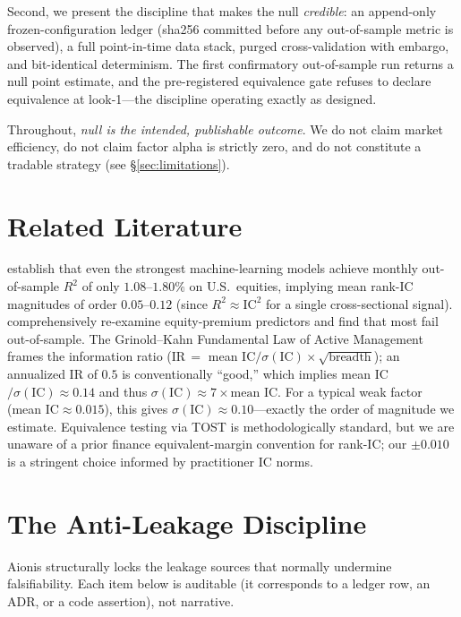 \documentclass[11pt,a4paper]{article}
\begin{document}
Second, we present the discipline that makes the null \emph{credible}: an
append-only frozen-configuration ledger (sha256 committed before any out-of-sample
metric is observed), a full point-in-time data stack, purged cross-validation with
embargo, and bit-identical determinism. The first confirmatory out-of-sample run
returns a null point estimate, and the pre-registered equivalence gate refuses to
declare equivalence at look-1---the discipline operating exactly as designed.

Throughout, \emph{null is the intended, publishable outcome}. We do not claim market
efficiency, do not claim factor alpha is strictly zero, and do not constitute a
tradable strategy (see \S\ref{sec:limitations}).

\section{Related Literature}\label{sec:related}

\citealt{gu2020empirical} establish that even the strongest machine-learning models
achieve monthly out-of-sample $R^2$ of only $1.08$--$1.80\%$ on U.S.\ equities,
implying mean rank-IC magnitudes of order $0.05$--$0.12$ (since $R^2\!\approx\!\text{IC}^2$
for a single cross-sectional signal). \citealt{goyal2008comprehensive} comprehensively
re-examine equity-premium predictors and find that most fail out-of-sample. The
Grinold--Kahn Fundamental Law of Active Management \citep{grinold1999active} frames
the information ratio (IR$\,=$ mean IC$/\sigma(\text{IC})\times\sqrt{\text{breadth}}$);
an annualized IR of $0.5$ is conventionally ``good,'' which implies mean IC$/\sigma(\text{IC})\!\approx\!0.14$
and thus $\sigma(\text{IC})\!\approx\!7\!\times\!\text{mean IC}$. For a typical weak
factor (mean IC$\approx 0.015$), this gives $\sigma(\text{IC})\!\approx\!0.10$---exactly
the order of magnitude we estimate. Equivalence testing via TOST
\citep{schuirmann1987,lakens2017} is methodologically standard, but we are unaware
of a prior finance equivalent-margin convention for rank-IC; our $\pm 0.010$ is a
stringent choice informed by practitioner IC norms.

\section{The Anti-Leakage Discipline}\label{sec:discipline}

Aionis structurally locks the leakage sources that normally undermine falsifiability.
Each item below is auditable (it corresponds to a ledger row, an ADR, or a code assertion),
not narrative.
\end{document}
